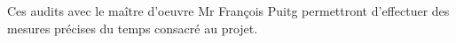 Ces audits avec le maître d’oeuvre Mr François Puitg permettront d'effectuer des mesures précises du temps consacré au projet.



